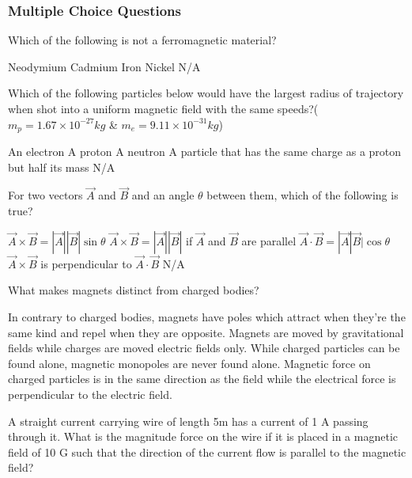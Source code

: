 \documentclass[12pt,addpoints]{exam}
\begin{document}
{{{				\subsubsection*{Multiple Choice Questions}
				\begin{questions}
					\question Which of the following is not a ferromagnetic material?\\ \begin{oneparchoices}
						\choice Neodymium
						\choice Cadmium
						\choice Iron
						\choice Nickel
						\choice N/A
					\end{oneparchoices}
					\question Which of the following particles below would have the largest radius of trajectory when shot into a uniform magnetic field with the same speeds?($m_p=1.67\times10^{-27}kg$ \& $m_e=9.11\times10^{-31}kg$) \\ \begin{oneparchoices}
						\choice An electron
						\choice A proton
						\choice A neutron
						\choice A particle that has the same charge as a proton but half its mass
						\choice N/A
					\end{oneparchoices}
					 \question For two vectors $\vec{A}$ and $\vec{B}$ and an angle $\theta$ between them, which of the following is true?\\ \begin{oneparchoices}
					 	\choice $\vec{A}\times\vec{B}=|\vec{A}||\vec{B}|\sin\theta$
					 	\choice $\vec{A}\times\vec{B}=|\vec{A}||\vec{B}|$ if $\vec{A}$ and $\vec{B}$ are parallel
					 	\choice $\vec{A}\cdot\vec{B}=|\vec{A}|\vec{B}|\cos\theta$
					 	\choice $\vec{A}\times\vec{B}$ is perpendicular to $\vec{A}\cdot\vec{B}$
					 	\choice N/A
					 \end{oneparchoices}
				 	\question What makes magnets distinct from charged bodies?
				 	\begin{choices}
				 		\choice In contrary to charged bodies, magnets have poles which attract when they're the same kind and repel when they are opposite.
				 		\choice Magnets are moved by gravitational fields while charges are moved electric fields only.
				 		\choice While charged particles can be found alone, magnetic monopoles are never found alone.
				 		\choice Magnetic force on charged particles is in the same direction as the field while the electrical force is perpendicular to the electric field.
				 	\end{choices}
				 	\question A straight current carrying wire of length 5m has a current of 1 A passing through it. What is the magnitude force on the wire if it is placed in a magnetic field of 10 G such that the direction of the current flow is parallel to the magnetic field?\\ \begin{oneparchoices}

\end{oneparchoices}
\end{questions}}}}
\end{document}
